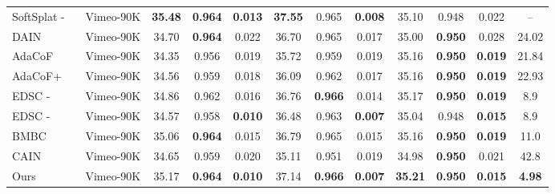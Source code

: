 \documentclass[final]{cvpr}
\begin{document}
\begin{table*}[!ht]
\begin{center}
\begin{tabular}{lccccccccccc}
SoftSplat - ~\cite{niklaus2020softmax}          &     Vimeo-90K       &   \color{blue}\textbf{35.48}       &    \color{blue}\textbf{0.964}         &    \color{blue}\textbf{0.013}       &   \color{blue}\textbf{37.55}       &  0.965        &   \color{blue}\textbf{0.008}        &  35.10        &  0.948    &  0.022   &  --  \\ 
DAIN~\cite{bao2019depth}   &    Vimeo-90K        &    34.70      &  \color{blue}\textbf{0.964}           &      0.022     &     36.70     &     0.965     &     0.017      &        35.00  &    \color{blue}\textbf{0.950}     &    0.028  &       24.02       \\ 
AdaCoF~\cite{lee2020adacof}       &     Vimeo-90K       &    34.35    & 0.956    & 0.019    & 35.72     & 0.959    & 0.019    & 35.16     & \color{blue}\textbf{0.950}   & \color{blue}\textbf{0.019}    & 21.84                           \\ 
AdaCoF+~\cite{lee2020adacof}       &     Vimeo-90K       &    34.56     &    0.959      &     0.018     &     36.09      &   0.962       &     0.017     &     35.16      &     \color{blue}\textbf{0.950}     &    \color{blue}\textbf{0.019}     &           22.93             \\
EDSC - ~\cite{cheng2020multiple}       &     Vimeo-90K       &    34.86      &     0.962     &     0.016      &   36.76     &   \color{blue}\textbf{0.966}  &    0.014    &      35.17    &  \color{blue}\textbf{0.950}          & \color{blue}\textbf{0.019}             &   8.9   \\ 
EDSC - ~\cite{cheng2020multiple}        &     Vimeo-90K       &    34.57      &    0.958      &    \color{red}\textbf{0.010}       &   36.48       &      0.963    &     \color{red}\textbf{0.007}      &   35.04       &  0.948  &  \color{red}\textbf{0.015}       &   8.9    \\
BMBC~\cite{park2020bmbc}       &         Vimeo-90K             &   35.06       &    \color{blue}\textbf{0.964}      &    0.015      &  36.79       &     0.965    &    0.015      &   35.16        &      \color{blue}\textbf{0.950}    &   \color{blue}\textbf{0.019}       &    11.0  \\
CAIN~\cite{choi2020channel}       &         Vimeo-90K             &   34.65       &     0.959     &     0.020     &   35.11   &    0.951      &   0.019       &      34.98     &     \color{blue}\textbf{0.950}     &     0.021     & 42.8  \\
Ours           &        Vimeo-90K                      &   {35.17}       &   \color{blue}\textbf{0.964}     &    \color{red}\textbf{0.010}      &  {37.14}         &   \color{blue}\textbf{0.966}        &   \color{red}\textbf{0.007}       &   \color{blue}\textbf{35.21}        &  \color{blue}\textbf{0.950}       &  \color{red}\textbf{0.015}        &       \color{red}\textbf{4.98}         \\
\bottomrule
\end{tabular}
\end{center}


\end{table*}
\end{document}
